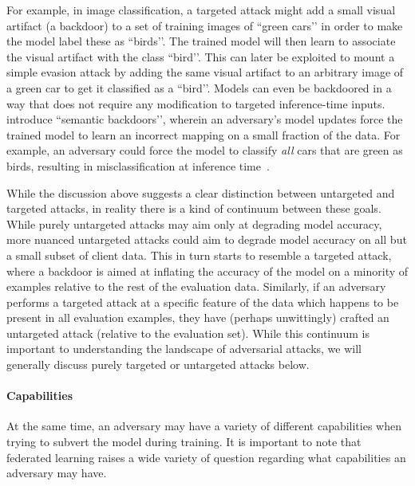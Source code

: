 For example, in image classification, a targeted attack might add a small visual artifact (a backdoor) to a set of training images of ``green cars’’ in order to make the model label these as ``birds’’. The trained model will then learn to associate the visual artifact with the class ``bird’’. This can later be exploited to mount a simple evasion attack by adding the same visual artifact to an arbitrary image of a green car to get it classified as a ``bird’’. Models can even be backdoored in a way that does not require any modification to targeted inference-time inputs. \citet{bagdasaryan18backdoor} introduce ``semantic backdoors’’, wherein an adversary's model updates force the trained model to learn an incorrect mapping on a small fraction of the data. For example, an adversary could force the model to classify \emph{all} cars that are green as birds, resulting in misclassification at inference time~\citep{bagdasaryan18backdoor}.

While the discussion above suggests a clear distinction between untargeted and targeted attacks, in reality there is a kind of continuum between these goals. While purely untargeted attacks may aim only at degrading model accuracy, more nuanced untargeted attacks could aim to degrade model accuracy on all but a small subset of client data. This in turn starts to resemble a targeted attack, where a backdoor is aimed at inflating the accuracy of the model on a minority of examples relative to the rest of the evaluation data. Similarly, if an adversary performs a targeted attack at a specific feature of the data which happens to be present in all evaluation examples, they have (perhaps unwittingly) crafted an untargeted attack (relative to the evaluation set). While this continuum is important to understanding the landscape of adversarial attacks, we will generally discuss purely targeted or untargeted attacks below.


\paragraph{Capabilities}
At the same time, an adversary may have a variety of different capabilities when trying to subvert the model during training. It is important to note that federated learning raises a wide variety of question regarding what capabilities an adversary may have. 



